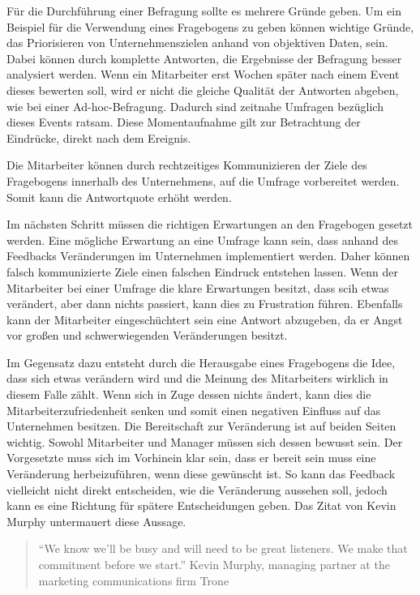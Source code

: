 Für die Durchführung einer Befragung sollte es mehrere Gründe geben. 
Um ein Beispiel für die Verwendung eines Fragebogens zu geben können wichtige Gründe, das Priorisieren von Unternehmenszielen anhand von objektiven Daten, sein. 
Dabei können durch komplette Antworten, die Ergebnisse der Befragung besser analysiert werden. 
Wenn ein Mitarbeiter erst Wochen später nach einem Event dieses bewerten soll, wird er nicht die gleiche Qualität der Antworten abgeben, wie bei einer Ad-hoc-Befragung.
Dadurch sind zeitnahe Umfragen bezüglich dieses Events ratsam. 
Diese Momentaufnahme gilt zur Betrachtung der Eindrücke, direkt nach dem Ereignis.

Die Mitarbeiter können durch rechtzeitiges Kommunizieren der Ziele des Fragebogens innerhalb des Unternehmens, auf die Umfrage vorbereitet werden. 
Somit kann die Antwortquote erhöht werden. 

Im nächsten Schritt müssen die richtigen Erwartungen an den Fragebogen gesetzt werden. 
Eine mögliche Erwartung an eine Umfrage kann sein, dass anhand des Feedbacks Veränderungen im Unternehmen implementiert werden. 
Daher können falsch kommunizierte Ziele einen falschen Eindruck entstehen lassen.
Wenn der Mitarbeiter bei einer Umfrage die klare Erwartungen besitzt, dass scih etwas verändert, aber dann nichts passiert, kann dies zu Frustration führen.
Ebenfalls kann der Mitarbeiter eingeschüchtert sein eine Antwort abzugeben, da er Angst vor großen und schwerwiegenden Veränderungen besitzt\autocite[Chapter 3
Setting Expectations]{Perfect}.

Im Gegensatz dazu entsteht durch die Herausgabe eines Fragebogens die Idee, dass sich etwas verändern wird und die Meinung des Mitarbeiters wirklich in diesem Falle zählt.
Wenn sich in Zuge dessen nichts ändert, kann dies die Mitarbeiterzufriedenheit senken und somit einen negativen Einfluss auf das Unternehmen besitzen.
Die Bereitschaft zur Veränderung ist auf beiden Seiten wichtig. 
Sowohl Mitarbeiter und Manager müssen sich dessen bewusst sein.
Der Vorgesetzte muss sich im Vorhinein klar sein, dass er bereit sein muss eine Veränderung herbeizuführen, wenn diese gewünscht ist.
So kann das Feedback vielleicht nicht direkt entscheiden, wie die Veränderung aussehen soll, jedoch kann es eine Richtung für spätere Entscheidungen geben. 
Das Zitat von Kevin Murphy untermauert diese Aussage\autocite[Chapter 3
Setting Expectations]{Perfect}.
\begin{quote} \enquote{We know we’ll be busy and will need to be great listeners. We make that commitment before we start.} Kevin Murphy, managing partner at the marketing communications firm Trone \end{quote}

